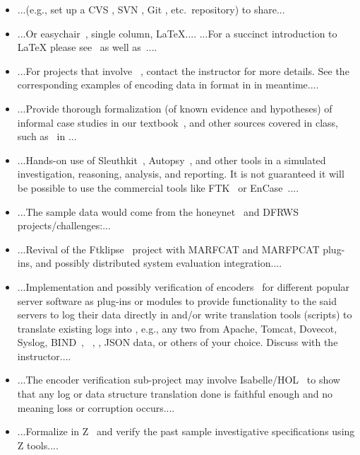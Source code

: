 \documentclass{easychair}
\begin{document}
\begin{itemize}
	\item 
...(e.g., set up a CVS \cite{cvs}, SVN \cite{svn}, Git \cite{aosa-book-vol2-git}, etc.\ repository) to share...
	\item 
...Or easychair~\cite{easychair-latex-class}, single column, {\LaTeX}....
%
...For a succinct introduction to {\LaTeX} please see~\cite{grogono2001}
as well as~\cite{wiki:wikibook:latex}....
	\item 
...For projects that involve {\flucid}~\cite{mokhov-phd-thesis-2013}, contact
the instructor for more details. See the corresponding examples of encoding
data in {\flucid} format in \cite[Chapter 9]{mokhov-phd-thesis-2013} in meantime....
	\item 
...Provide thorough formalization (of known evidence and hypotheses) of informal
case studies in our textbook~\cite[Chapters 3, 7]{boismenu-inse691e-f2012},
and other sources covered in class, such as~\cite{conu-sec-anne-mja-1995} in {\flucid}...
	\item 
...Hands-on use of
Sleuthkit~\cite{sleuthkit},
Autopsy~\cite{autopsy-forensic-browser},
and other tools in a simulated investigation,
reasoning, analysis, and reporting.
%
It is not guaranteed it will be possible to use the commercial
tools like FTK~\cite{ftk} or EnCase~\cite{encase,encase-forensics-ence-study-guide-2012}....
	\item 
...The sample data would come from the honeynet~\cite{honeynet} and DFRWS~\cite{palmer01} projects/challenges:...
	\item 
...Revival of the Ftklipse~\cite{ftklipse,ftklipse-srs,ftklipse-sdd} project with
MARFCAT and MARFPCAT plug-ins, and possibly distributed system evaluation
integration....
	\item 
...Implementation and possibly verification of {\flucid} encoders~\cite{mac-spoofer-analyzer-detail-fps2014} for
different popular server software as plug-ins or modules to provide
functionality to the said servers to log their data directly in
{\flucid} and/or write translation tools (scripts) to translate
existing logs into {\flucid}, e.g., any two from Apache, Tomcat, Dovecot,
Syslog, BIND~\cite{dns-and-bind-98}, ~\cite{linux-iptables-pocket-2004,%
linux-firewalls-ids-2007}, , JSON data, or others of your choice. Discuss with the
instructor....

	\item 
...The encoder verification sub-project may involve Isabelle/HOL~\cite{isabelle,isabelle-hol-tutorial}
to show that any log or data structure translation done is faithful enough and no meaning loss
or corruption occurs....

	\item 
...Formalize {\flucid} in Z~\cite{cztweb,zref92} and verify
the past sample {\flucid} investigative specifications
using Z tools....

\end{itemize}
\end{document}
